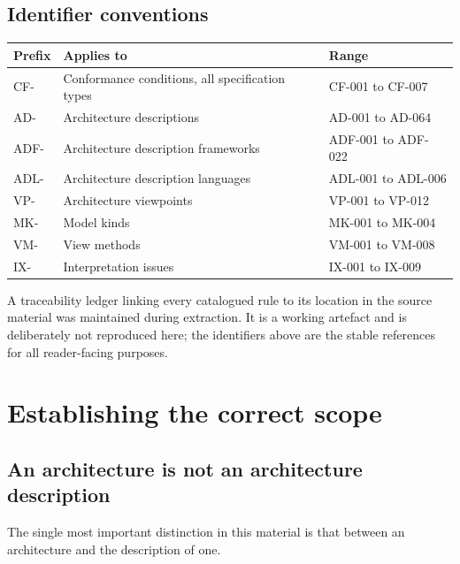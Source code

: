 \documentclass[11pt,a4paper]{report}
\begin{document}
\section{Identifier conventions}

\begin{center}
\small
\begin{tabular}{@{}l l l@{}}
\toprule
\textbf{Prefix} & \textbf{Applies to} & \textbf{Range} \\
\midrule
\textsf{CF-}  & Conformance conditions, all specification types & CF-001 to CF-007 \\
\textsf{AD-}  & Architecture descriptions                       & AD-001 to AD-064 \\
\textsf{ADF-} & Architecture description frameworks             & ADF-001 to ADF-022 \\
\textsf{ADL-} & Architecture description languages              & ADL-001 to ADL-006 \\
\textsf{VP-}  & Architecture viewpoints                         & VP-001 to VP-012 \\
\textsf{MK-}  & Model kinds                                     & MK-001 to MK-004 \\
\textsf{VM-}  & View methods                                    & VM-001 to VM-008 \\
\textsf{IX-}  & Interpretation issues                           & IX-001 to IX-009 \\
\bottomrule
\end{tabular}
\end{center}

A traceability ledger linking every catalogued rule to its location in the
source material was maintained during extraction. It is a working artefact and
is deliberately not reproduced here; the identifiers above are the stable
references for all reader-facing purposes.

\chapter{Establishing the correct scope}

\section{An architecture is not an architecture description}

The single most important distinction in this material is that between an
architecture and the description of one.
\end{document}
